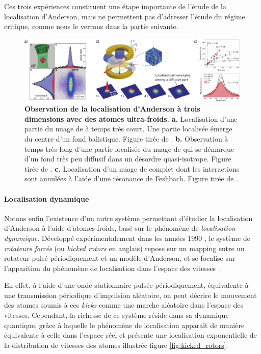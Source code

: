 Ces trois expériences constituent une étape importante de l'étude de la localisation d'Anderson, mais ne permettent pas d'adresser l'étude du régime critique, comme nous le verrons dans la partie suivante. 

\begin{figure}
\centering
\includegraphics[width=\textwidth]{Fig/Localisation/localisation_3D_atomes_v1.pdf}
\caption{\textbf{Observation de la localisation d'Anderson à trois dimensions avec des atomes ultra-froids.} \textbf{a.} Localisation d'une partie du nuage de  à temps très court. Une partie localisée émerge du centre d'un fond balistique. Figure tirée de \citep{kondov2011three}. \textbf{b.} Observation à temps très long d'une partie localisée du nuage de  qui se démarque d'un fond très peu diffusif dans un désordre quasi-isotrope. Figure tirée de \citep{jendrzejewski2012three}. \textbf{c.} Localisation d'un nuage de  complet dont les interactions sont annulées à l'aide d'une résonance de Feshbach. Figure tirée de \citep{semeghini2015measurement}.}
\label{fig:localisation_3D_atomes_froids}
\end{figure}





\paragraph*{Localisation dynamique}
Notons enfin l'existence d'un autre système permettant d'étudier la localisation d'Anderson à l'aide d'atomes froids, basé sur le phénomène de \emph{localisation dynamique}. Développé expérimentalement dans les années 1990 \citep{moore1995atom}, le système de \emph{rotateurs forcés} (ou \emph{kicked rotors} en anglais) repose sur un mapping entre un rotateur pulsé périodiquement et un modèle d'Anderson, et se focalise sur l'apparition du phénomène de localisation dans l'espace des vitesses \citep{lemarietel-00424399}. 

En effet, à l'aide d'une onde stationnaire pulsée périodiquement, équivalente à une transmission périodique d'impulsion aléatoire, on peut décrire le mouvement des atomes soumis à ces \emph{kicks} comme une marche aléatoire dans l'espace des vitesses. Cependant, la richesse de ce système réside dans sa dynamique quantique, grâce à laquelle le phénomène de localisation apparaît de manière équivalente à celle dans l'espace réel et présente une localisation exponentielle de la distribution de vitesses des atomes illustrée figure \ref{fig:kicked_rotors}.

